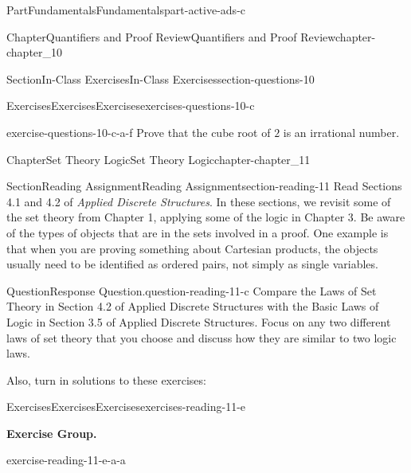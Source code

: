 \documentclass[oneside,10pt,]{book}
\numberwithin{equation}{section}
\begin{document}
\begin{partptx}{Part}{Fundamentals}{}{Fundamentals}{}{}{part-active-ads-c}
\begin{chapterptx}{Chapter}{Quantifiers and Proof Review}{}{Quantifiers and Proof Review}{}{}{chapter-chapter_10}
\begin{sectionptx}{Section}{In-Class Exercises}{}{In-Class Exercises}{}{}{section-questions-10}
\begin{exercises-subsection-numberless}{Exercises}{Exercises}{}{Exercises}{}{}{exercises-questions-10-c}
\begin{exercisegroup}
\begin{divisionexerciseeg}{6}{}{}{exercise-questions-10-c-a-f}%
Prove that the cube root of \(2\) is an irrational number.%
\end{divisionexerciseeg}%
\end{exercisegroup}
\par\medskip\noindent
\end{exercises-subsection-numberless}
\end{sectionptx}
\end{chapterptx}
%
\typeout{************************************************}
\typeout{************************************************}
%
\begin{chapterptx}{Chapter}{Set Theory Logic}{}{Set Theory Logic}{}{}{chapter-chapter_11}
\renewcommand*{\chaptername}{Chapter}
%
%
\typeout{************************************************}
\typeout{************************************************}
%
\begin{sectionptx}{Section}{Reading Assignment}{}{Reading Assignment}{}{}{section-reading-11}
Read Sections 4.1  and 4.2 of \emph{Applied Discrete Structures}.  In these sections, we revisit some of the set theory from Chapter 1, applying some of the logic in Chapter 3. Be aware of the types of objects that are in the sets involved in a proof.  One example is that when you are proving something about Cartesian products, the objects usually need to be identified as ordered pairs, not simply as single variables.%
\begin{question}{Question}{Response Question.}{question-reading-11-c}%
Compare the Laws of Set Theory in Section 4.2 of Applied Discrete Structures with the Basic Laws of Logic in Section 3.5 of Applied Discrete Structures.  Focus on any two different laws of set theory that you choose and discuss how they are similar to two logic laws.%
\end{question}
Also, turn in solutions to these exercises:%
%
%
\typeout{************************************************}
\typeout{************************************************}
%
\begin{exercises-subsection-numberless}{Exercises}{Exercises}{}{Exercises}{}{}{exercises-reading-11-e}
\par\medskip\noindent%
\textbf{Exercise Group.}\space\space%
\begin{exercisegroup}
\begin{divisionexerciseeg}{1}{}{}{exercise-reading-11-e-a-a}%

\end{divisionexerciseeg}
\end{exercisegroup}
\end{exercises-subsection-numberless}
\end{sectionptx}
\end{chapterptx}
\end{partptx}
\end{document}
